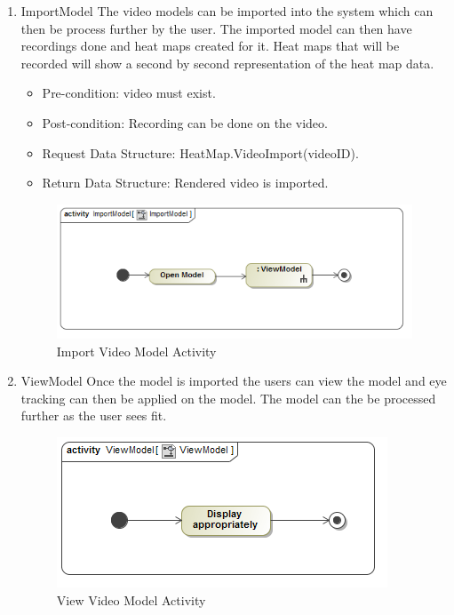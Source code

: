 		\begin{enumerate}
			\item{ImportModel}
			\newline
			The video models can be imported into the system which can then be process further by the user. The imported model can then have recordings done and heat maps created for it. Heat maps that will be recorded will show a second by second representation of the heat map data.
			\begin{itemize}
				\item Pre-condition: video must exist.
				\item Post-condition: Recording can be done on the video.
				\item Request Data Structure: HeatMap.VideoImport(videoID).
				\item Return Data Structure: Rendered video is imported.
			\end{itemize}
			
			\begin{figure}[!ht]
				\centering
				\includegraphics[scale=0.5]{Diagrams/Activity_Diagram__ImportModel__ImportModel.png}
				\caption{Import Video Model Activity}
			\end{figure}
			
			\item{ViewModel}
Once the model is imported the users can view the model and eye tracking can then be applied on the model. The model can the be processed further as the user sees fit.
			\begin{figure}
				\centering
				\includegraphics[scale=0.5]{Diagrams/Activity_Diagram__ViewModel__ViewModel.png}
				\caption{View Video Model Activity}
			\end{figure}
			

\end{enumerate}
